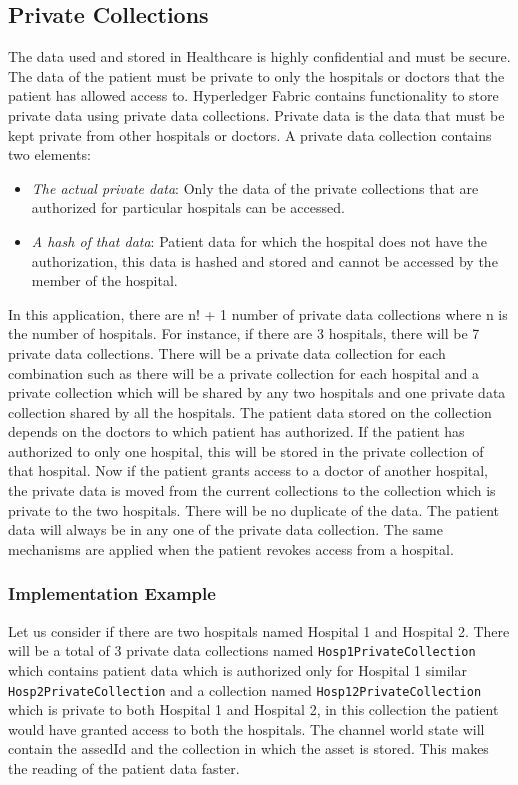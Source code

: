 \subsection{Private Collections}
The data used and stored in Healthcare is highly confidential and must be secure. The data of the patient must be private to only the hospitals or doctors that the patient has allowed access to. Hyperledger Fabric contains functionality to store private data using private data collections\cite{Privatedata}. Private data is the data that must be kept private from other hospitals or doctors. A private data collection contains two elements:
\begin{itemize}
    \item \emph{The actual private data}: Only the data of the private collections that are authorized for particular hospitals can be accessed. 
    \item \emph{A hash of that data}: Patient data for which the hospital does not have the authorization, this data is hashed and stored and cannot be accessed by the member of the hospital.
\end{itemize}
In this application, there are n! + 1 number of private data collections where n is the number of hospitals. For instance, if there are 3 hospitals, there will be 7 private data collections. There will be a private data collection for each combination such as there will be a private collection for each hospital and a private collection which will be shared by any two hospitals and one private data collection shared by all the hospitals. The patient data stored on the collection depends on the doctors to which patient has authorized. If the patient has authorized to only one hospital, this will be stored in the private collection of that hospital. Now if the patient grants access to a doctor of another hospital, the private data is moved from the current collections to the collection which is private to the two hospitals. There will be no duplicate of the data. The patient data will always be in any one of the private data collection. The same mechanisms are applied when the patient revokes access from a hospital.

\subsubsection{Implementation Example}

Let us consider if there are two hospitals named Hospital 1 and Hospital 2. There will be a total of 3 private data collections named \lstinline{Hosp1PrivateCollection} which contains patient data which is authorized only for Hospital 1 similar \lstinline{Hosp2PrivateCollection} and a collection named \lstinline{Hosp12PrivateCollection} which is private to both Hospital 1 and Hospital 2, in this collection the patient would have granted access to both the hospitals. The channel world state will contain the assedId and the collection in which the asset is stored. This makes the reading of the patient data faster. 

